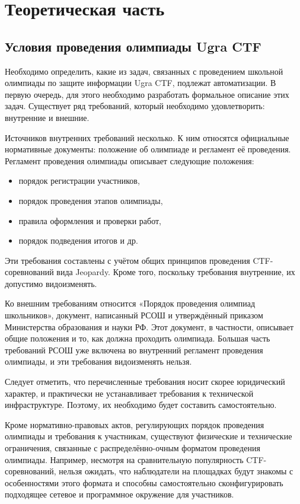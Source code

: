 \chapter{Теоретическая часть}



\section{Условия проведения олимпиады Ugra CTF}

Необходимо определить, какие из задач, связанных с проведением школьной олимпиады по защите информации Ugra CTF, подлежат автоматизации. В первую очередь, для этого необходимо разработать формальное описание этих задач. Существует ряд требований, который необходимо удовлетворить: внутренние и внешние.

Источников внутренних требований несколько. К ним относятся официальные нормативные документы: положение об олимпиаде и регламент её проведения. Регламент проведения олимпиады описывает следующие положения:

\begin{itemize}
\item порядок регистрации участников,
\item порядок проведения этапов олимпиады,
\item правила оформления и проверки работ,
\item порядок подведения итогов и др.
\end{itemize}

Эти требования составлены с учётом общих принципов проведения CTF-соревнований вида Jeopardy. Кроме того, поскольку требования внутренние, их допустимо видоизменять.

Ко внешним требованиям относится «Порядок проведения олимпиад школьников»\cite{Rosolymp}, документ, написанный РСОШ и утверждённый приказом Министерства образования и науки РФ. Этот документ, в частности, описывает общие положения и то, как должна проходить олимпиада. Большая часть требований РСОШ уже включена во внутренний регламент проведения олимпиады, и эти требования видоизменять нельзя.

Следует отметить, что перечисленные требования носит скорее юридический характер, и практически не устанавливает требования к технической инфраструктуре. Поэтому, их необходимо будет составить самостоятельно.

Кроме нормативно-правовых актов, регулирующих порядок проведения олимпиады и требования к участникам, существуют физические и технические ограничения, связанные с распределённо-очным форматом проведения олимпиады. Например, несмотря на сравнительную популярность CTF-соревнований, нельзя ожидать, что наблюдатели на площадках будут знакомы с особенностями этого формата и способны самостоятельно сконфигурировать подходящее сетевое и программное окружение для участников.

